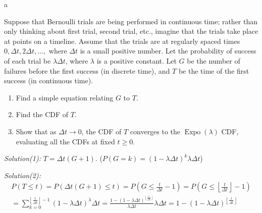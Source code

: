 \documentclass[8pt]{beamer}
\newcommand{\myexpo}[1]{\operatorname{Expo}\!\left(#1\right)}
\begin{document}
 \begin{frame}{a}
    \begin{examples}[5.43]
        Suppose that Bernoulli trials are being performed in continuous time; rather than only thinking about first trial, second trial, etc., imagine that the trials take place at points on a timeline. Assume that the trials are at regularly spaced times $0, \Delta t, 2\Delta t, \dots,$ where $\Delta t$ is a small positive number. Let the probability of success of each trial be $\lambda \Delta t$, where $\lambda$ is a positive constant. Let $G$ be the number of failures before the first success (in discrete time), and $T$ be the time of the first success (in continuous time).
        \begin{enumerate}
            \item Find a simple equation relating $G$ to $T$.
            \item Find the CDF of $T$.
            \item Show that as $\Delta t\rightarrow 0$, the CDF of $T$ converges to the $\myexpo{\lambda}$ CDF, evaluating all the CDFs at fixed $t \geq 0$.
        \end{enumerate}
    \end{examples}
    \textit{Solution(1):} $T = \Delta t (G+1)$. ($P(G=k) = (1- \lambda \Delta t)^k \lambda \Delta t$)

    \textit{Solution(2):} \[\begin{gathered}
        P(T \leq t) = P(\Delta t (G+1) \leq t) = P(G \leq \frac{t}{\Delta t} -1) = P(G \leq \left\lfloor \frac{t}{\Delta t} \right\rfloor - 1) \\
        = \sum_{k=0}^{\left\lfloor \frac{t}{\Delta t}\right\rfloor - 1} (1-\lambda \Delta t)^ \lambda \Delta t = \frac{1 - (1 - \lambda \Delta t)^{\left\lfloor\frac{t}{\Delta t} \right\rfloor}}{\lambda \Delta t} \lambda \Delta t = 1 - (1-\lambda \Delta t)^{\left\lfloor \frac{t}{\Delta t}\right\rfloor}
    \end{gathered}
    \]


 
 \end{frame}
\end{document}
